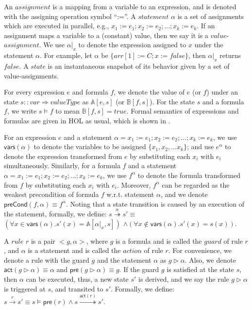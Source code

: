 \documentclass[conference]{IEEEtran}
\begin{document}
{An $assignment$ is a mapping from a variable to an expression, and is denoted with the assigning operation symbol ``:=''. A $statement$ $\alpha$ is a set of assignments which are executed in parallel, e.g., $ x_1:=e_1;x_2:=e_2;...;x_k:=e_k $. If an assignment maps a variable to a (constant) value, then we say it is a $value$-$assignment$.  We use $\alpha|_x$ to denote the expression assigned to $x$ under the statement $\alpha$. For example, let $\alpha$ be $\{arr[1]:=C;x:=false\}$, then $\alpha|_x$ returns $false$. A $state$ is an instantaneous snapshot of its behavior given by a set of value-assignments.




For every expression $e$ and formula $f$, we denote the value of $e$ (or $f$) under an state $s::var \Rightarrow valueType $ as $\mathbb{A}[e,s]$ (or $\mathbb{B}[f,s]$).
For the state $s$ and a formula $f$, we write
$s\models f$ to mean %
$\mathbb{B}[f,s]=true$.
Formal semantics of expressions and formulas are given in HOL  as usual, which is shown in \cite{LiCache16}. %


For an expression $e$ and a statement $\alpha= x_1:=e_1;x_2:=e_2;...;x_k:=e_k $, we use $\mathsf{vars(\alpha)}$ to denote the variables to be assigned $\{x_1,x_2,...x_k\}$; and use $e^{\alpha}$ to denote the expression transformed from $e$ by substituting each $x_i$ with $e_i$ simultaneously.
Similarly, for a formula $f$  and a statement $\alpha= x_1:=e_1;x_2:=e_2;...;x_k:=e_k $, we use $f^{\alpha}$ to denote the formula transformed from $f$ by substituting each $x_i$ with $e_i$.
Moreover, $f^{\alpha}$ can be regarded as the weakest precondition of formula $f$ w.r.t. statement $\alpha$, and we denote $\mathsf{preCond}(f,\alpha)\equiv f^{\alpha}$. Noting that a state transition is caused by an execution of the statement, formally, we define: $s\overset{\alpha}{\twoheadrightarrow } s' \equiv$ $(\forall x \in \mathsf{vars}(\alpha). s'(x)= \mathbb{A}[\alpha|_x,s])$ $\wedge (\forall x \notin \mathsf{vars}(\alpha). s'(x)= s(x))$.

A $rule$ $r$ is a pair $<g,\alpha>$, where $g$ is a formula and is called the $guard$ of rule $r$, and $\alpha$ is a statement and is called the $action$ of rule $r$.
 For convenience, we denote a rule with the guard $g$ and the statement $\alpha$ as $g \vartriangleright \alpha$. Also, we denote $\mathsf{act}(g \vartriangleright \alpha)\equiv \alpha$ and $\mathsf{pre}(g \vartriangleright \alpha)\equiv g$. If the guard $g$ is satisfied at the state $s$, then $\alpha$ can be executed, thus, a new state $s'$ is derived, and we say the rule $g \vartriangleright \alpha$ is triggered at $s$, and transited to $s'$. Formally, we define: $s\overset{r}{\rightarrow } s' \equiv s\models \mathsf{pre}(r) \wedge s\overset{\mathsf{act}(r)}{\twoheadrightarrow } s'$.

}
\end{document}

